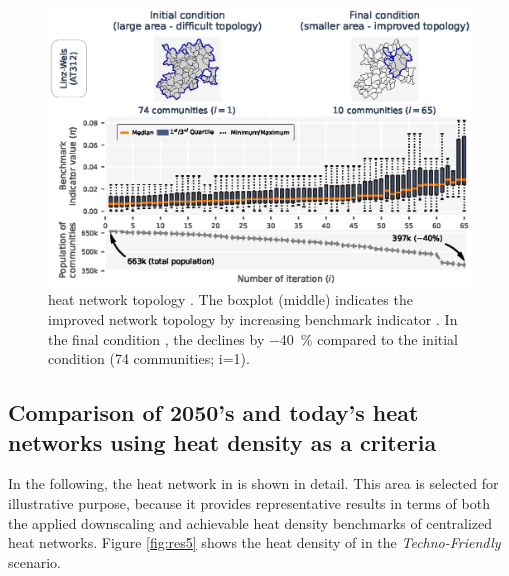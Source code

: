 \begin{figure}
	\centering
	\includegraphics[width=1\linewidth]{figures/4_Results/Fig_Boxplot/ext_boxplot.eps}
	\caption{ heat network topology . The boxplot (middle) indicates the improved network topology by  increasing benchmark indicator . In the final condition , the  declines by \SI{-40}{\%} compared to the initial condition (74 communities; i=1).}
	\label{fig:res3}
\end{figure}

\subsection{Comparison of 2050's and today's  heat networks using heat density as a criteria}\label{res:5}
In the following, the  heat network in  is shown in detail. This area is selected for illustrative purpose, because it provides representative results in terms of both the applied downscaling and achievable heat density benchmarks of centralized heat networks. Figure \ref{fig:res5} shows the heat density of  in the \textit{Techno-Friendly} scenario.

